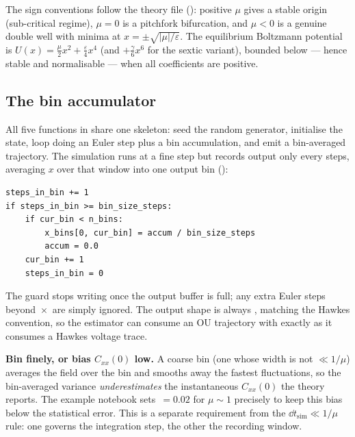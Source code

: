 The sign conventions follow the theory file
(): positive $\mu$ gives a stable origin
(sub-critical regime), $\mu = 0$ is a pitchfork bifurcation, and $\mu < 0$ is a
genuine double well with minima at $x = \pm\sqrt{|\mu|/\varepsilon}$. The
equilibrium Boltzmann potential is $U(x) = \tfrac{\mu}{2}x^{2} +
\tfrac{\varepsilon}{4}x^{4}$ (and $+\tfrac{\gamma}{6}x^{6}$ for the sextic
variant), bounded below --- hence stable and normalisable --- when all coefficients
are positive.

\subsection{The bin accumulator}

All five functions in  share one skeleton: seed
the random generator, initialise the state, loop  doing an Euler
step plus a bin accumulation, and emit a bin-averaged trajectory. The simulation
runs at a fine step  but records output only every
 steps, averaging $x$ over that window into one output bin
():

\begin{lstlisting}
steps_in_bin += 1
if steps_in_bin >= bin_size_steps:
    if cur_bin < n_bins:
        x_bins[0, cur_bin] = accum / bin_size_steps
        accum = 0.0
    cur_bin += 1
    steps_in_bin = 0
\end{lstlisting}

The guard  stops writing once the output buffer is
full; any extra Euler steps beyond \,$\times$\,
are simply ignored. The output shape is always , matching
the Hawkes  convention, so the estimator can consume an OU
trajectory with  exactly as it consumes a Hawkes
voltage trace.

\begin{gotcha}
\textbf{Bin finely, or bias $C_{xx}(0)$ low.} A coarse bin (one whose width
 is not $\ll 1/\mu$) averages the field over the bin and smooths away
the fastest fluctuations, so the bin-averaged variance \emph{underestimates} the
instantaneous $C_{xx}(0)$ the theory reports. The example notebook sets
\,$= 0.02$ for $\mu \sim 1$ precisely to keep this bias below the
statistical error. This is a separate requirement from the $\dd t_{\mathrm{sim}}
\ll 1/\mu$ rule: one governs the integration step, the other the recording window.
\end{gotcha}


